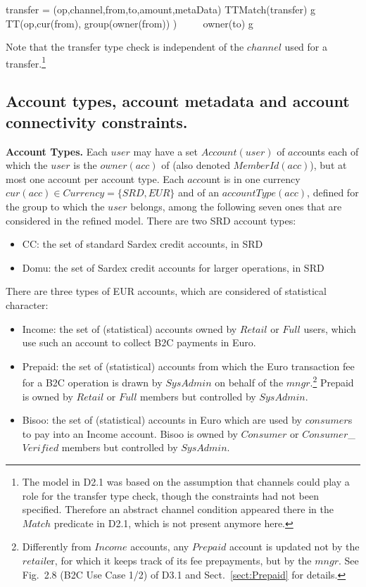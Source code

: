 \begin{asm}
\LET transfer = (op,channel,from,to,amount,metaData) \+
TTMatch(transfer) \IFF \+
\FORSOME g   \in	TT(op,cur(from), group(owner(from)) ) ~~~~  
    owner(to) \in g
\end{asm}

Note that the transfer type check is independent of the $channel$ used for a transfer.\footnote{The model in D2.1 was based on the assumption that channels could play a role for the transfer type check, though the constraints had not been specified. Therefore an abstract channel condition appeared there in the $Match$ predicate in D2.1, which is not present anymore here.}



\subsection{Account types, account metadata and account connectivity constraints.}
\label{sect:accounts}

{\bf Account Types.} Each $user$ may have a set $Account(user)$ of $acc$ounts each of which the $user$ is the  $owner(acc)$ of (also denoted $MemberId(acc)$), but at most one account per account type. Each $acc$ount is in one currency $cur(acc) \in Currency=\{SRD,EUR\}$ and of an $accountType(acc)$, defined for the group to which the $user$ belongs, among the following seven ones that are considered in the refined model. There are two SRD account types:
\begin{itemize}
	\item CC: the set of standard Sardex credit accounts, in SRD
	\item Domu:  the set of Sardex credit accounts for larger operations, in SRD
\end{itemize}

There are three types of EUR accounts, which are considered of statistical character:
\begin{itemize}
	\item  Income: the set of (statistical) accounts owned by $Retail$ or $Full$ users, which use such an account to collect B2C payments in Euro.
	
	\item Prepaid: the set of (statistical) accounts from which the Euro transaction fee for a B2C operation is drawn by $SysAdmin$ on behalf of the $mngr$.\footnote{Differently from $Income$ accounts, any $Prepaid$ account is updated not by the $retail$er, for which it keeps track of its fee prepayments, but by the $mngr$. See Fig.\ 2.8 (B2C Use Case 1/2) of D3.1 and Sect.~\ref{sect:Prepaid} for details.} 
	Prepaid is owned by $Retail$ or $Full$ members but controlled by $SysAdmin$.
	
	\item Bisoo: the set of (statistical) accounts in Euro which are used by $consumer$s to pay into an Income account. Bisoo is owned by $Consumer$ or $Consumer$\_$Verified$ members but controlled by $SysAdmin$.
\end{itemize}

